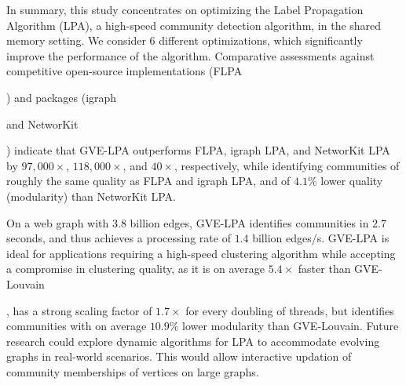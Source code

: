 
In summary, this study concentrates on optimizing the Label Propagation Algorithm (LPA), a high-speed community detection algorithm, in the shared memory setting. We consider 6 different optimizations, which significantly improve the performance of the algorithm. Comparative assessments against competitive open-source implementations (FLPA) and packages (igraph and NetworKit) indicate that GVE-LPA outperforms FLPA, igraph LPA, and NetworKit LPA by $97,000\times$, $118,000\times$, and $40\times$, respectively, while identifying communities of roughly the same quality as FLPA and igraph LPA, and of $4.1\%$ lower quality (modularity) than NetworKit LPA.

On a web graph with $3.8$ billion edges, GVE-LPA identifies communities in $2.7$ seconds, and thus achieves a processing rate of $1.4$ billion edges/s. GVE-LPA is ideal for applications requiring a high-speed clustering algorithm while accepting a compromise in clustering quality, as it is on average $5.4\times$ faster than GVE-Louvain, has a strong scaling factor of $1.7\times$ for every doubling of threads, but identifies communities with on average $10.9\%$ lower modularity than GVE-Louvain. Future research could explore dynamic algorithms for LPA to accommodate evolving graphs in real-world scenarios. This would allow interactive updation of community memberships of vertices on large graphs.
